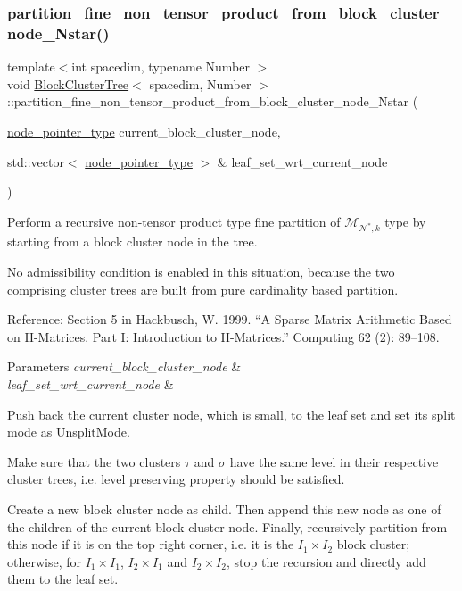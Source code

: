 \subsubsection{\texorpdfstring{partition\+\_\+fine\+\_\+non\+\_\+tensor\+\_\+product\+\_\+from\+\_\+block\+\_\+cluster\+\_\+node\+\_\+\+Nstar()}{partition\_fine\_non\_tensor\_product\_from\_block\_cluster\_node\_Nstar()}}
{\footnotesize\ttfamily template$<$int spacedim, typename Number $>$ \\
void \hyperlink{classBlockClusterTree}{Block\+Cluster\+Tree}$<$ spacedim, Number $>$\+::partition\+\_\+fine\+\_\+non\+\_\+tensor\+\_\+product\+\_\+from\+\_\+block\+\_\+cluster\+\_\+node\+\_\+\+Nstar (\begin{DoxyParamCaption}\item[{\hyperlink{classTreeNode}{node\+\_\+pointer\+\_\+type}}]{current\+\_\+block\+\_\+cluster\+\_\+node,  }\item[{std\+::vector$<$ \hyperlink{classTreeNode}{node\+\_\+pointer\+\_\+type} $>$ \&}]{leaf\+\_\+set\+\_\+wrt\+\_\+current\+\_\+node }\end{DoxyParamCaption})\hspace{0.3cm}{\ttfamily [private]}}

Perform a recursive non-\/tensor product type fine partition of $\mathcal{M}_{\mathcal{N}^*,k}$ type by starting from a block cluster node in the tree.

No admissibility condition is enabled in this situation, because the two comprising cluster trees are built from pure cardinality based partition.

Reference\+: Section 5 in Hackbusch, W. 1999. “A Sparse Matrix Arithmetic Based on H-\/\+Matrices. Part I\+: Introduction to H-\/\+Matrices.” Computing 62 (2)\+: 89–108. 
\begin{DoxyParams}{Parameters}
{\em current\+\_\+block\+\_\+cluster\+\_\+node} & \\
\hline
{\em leaf\+\_\+set\+\_\+wrt\+\_\+current\+\_\+node} & \\
\hline
\end{DoxyParams}
Push back the current cluster node, which is small, to the leaf set and set its split mode as {\ttfamily Unsplit\+Mode}.

Make sure that the two clusters $\tau$ and $\sigma$ have the same level in their respective cluster trees, i.\+e. level preserving property should be satisfied.

Create a new block cluster node as child. Then append this new node as one of the children of the current block cluster node. Finally, recursively partition from this node if it is on the top right corner, i.\+e. it is the $I_1 \times I_2$ block cluster; otherwise, for $I_1 \times I_1$, $I_2 \times I_1$ and $I_2 \times I_2$, stop the recursion and directly add them to the leaf set.

